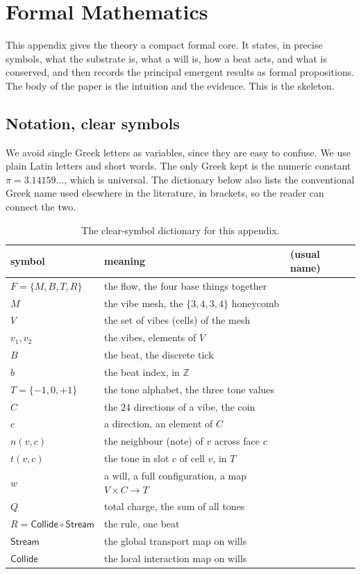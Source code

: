 \section{Formal Mathematics}

This appendix gives the theory a compact formal core. It states, in precise symbols, what the substrate is, what
a will is, how a beat acts, and what is conserved, and then records the principal emergent results as formal
propositions. The body of the paper is the intuition and the evidence. This is the skeleton.

\subsection{Notation, clear symbols}

We avoid single Greek letters as variables, since they are easy to confuse. We use plain Latin letters and short
words. The only Greek kept is the numeric constant $\pi = 3.14159\ldots$, which is universal. The dictionary below
also lists the conventional Greek name used elsewhere in the literature, in brackets, so the reader can connect
the two.

\begin{table}[h]
\centering
\begin{tabular}{lll}
\toprule
symbol & meaning & (usual name) \\
\midrule
$F = \{M, B, T, R\}$ & the flow, the four base things together & \\
$M$ & the vibe mesh, the $\{3,4,3,4\}$ honeycomb & \\
$V$ & the set of vibes (cells) of the mesh & \\
$v_1, v_2$ & the vibes, elements of $V$ & \\
$B$ & the beat, the discrete tick & \\
$b$ & the beat index, in $\mathbb{Z}$ & \\
$T = \{-1, 0, +1\}$ & the tone alphabet, the three tone values & \\
$C$ & the $24$ directions of a vibe, the coin & \\
$c$ & a direction, an element of $C$ & \\
$n(v, c)$ & the neighbour (note) of $v$ across face $c$ & \\
$t(v, c)$ & the tone in slot $c$ of cell $v$, in $T$ & \\
$w$ & a will, a full configuration, a map $V \times C \to T$ & \\
$Q$ & total charge, the sum of all tones & \\
$R = \mathsf{Collide} \circ \mathsf{Stream}$ & the rule, one beat & \\
$\mathsf{Stream}$ & the global transport map on wills & \\
$\mathsf{Collide}$ & the local interaction map on wills & \\
\bottomrule
\end{tabular}
\caption{The clear-symbol dictionary for this appendix.}
\end{table}

